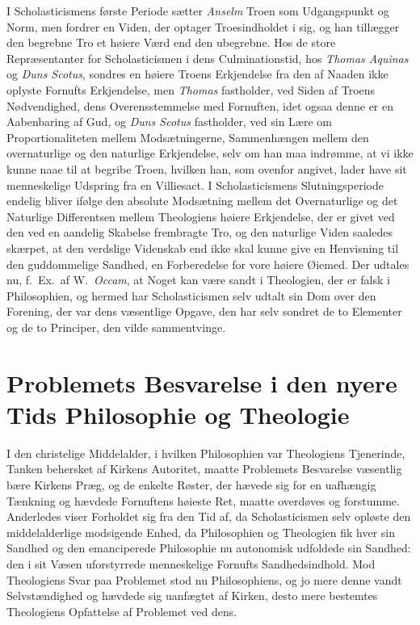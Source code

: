 \documentclass[12pt,a4paper]{book}
\newcommand{\opage}[1]{\marginnote{\footnotesize\textit{[#1]}}}
\begin{document}
I Scholasticismens første Periode sætter \emph{Anselm} Troen som Udgangspunkt og Norm,
men fordrer en Viden, der optager Troesindholdet i sig, og han tillægger den
begrebne Tro et høiere Værd end den ubegrebne. Hos de store Repræsentanter for
Scholasticismen i dens Culminationstid, hos \emph{Thomas Aquinas} og \emph{Duns Scotus}, sondres
en høiere Troens Erkjendelse fra den af Naaden ikke oplyste Fornufts Erkjendelse,
men \emph{Thomas} fastholder, ved Siden af Troens Nødvendighed, dens Overensstemmelse med
Fornuften, idet ogsaa denne er en Aabenbaring af Gud, og \emph{Duns Scotus} fastholder,
ved sin Lære om Proportionaliteten mellem Modsætningerne, Sammenhængen mellem den
overnaturlige og den naturlige Erkjendelse, selv om han maa indrømme, at vi ikke
kunne naae til at begribe Troen, hvilken han, som ovenfor angivet, lader have sit
menneskelige Udspring fra en Villiesact. I Scholasticismens Slut\opage{21}ningsperiode
endelig bliver ifølge den absolute Modsætning mellem det Overnaturlige og det
Naturlige Differentsen mellem Theologiens høiere Erkjendelse, der er givet ved den
ved en aandelig Skabelse frembragte Tro, og den naturlige Viden saaledes skærpet,
at den verdslige Videnskab end ikke skal kunne give en Henvisning til den
guddommelige Sandhed, en Forberedelse for vore høiere Øiemed. Der udtales nu, f.\
Ex.\ af W.\ \emph{Occam}, at Noget kan være sandt i Theologien, der er falsk i
Philosophien, og hermed har Scholasticismen selv udtalt sin Dom over den Forening,
der var dens væsentlige Opgave, den har selv sondret de to Elementer og de to
Principer, den vilde sammentvinge.

\section{Problemets Besvarelse i den nyere Tids Philosophie og Theologie}
\label{sec:nyere-tid}

\noindent I den christelige Middelalder, i hvilken Philosophien var Theologiens
Tjenerinde, Tanken behersket af Kirkens Autoritet, maatte Problemets Besvarelse
væsentlig bære Kirkens Præg, og de enkelte Røster, der hævede sig for en
uafhængig Tænkning og hævdede Fornuftens høieste Ret, maatte overdøves og
forstumme. Anderledes viser Forholdet sig fra den Tid af, da Scholasticismen selv
opløste den middelalderlige modsigende Enhed, da Philosophien og Theologien fik
hver sin Sandhed og den emanciperede Philosophie nu autonomisk udfoldede sin
Sandhed: den i sit Væsen uforstyrrede menneskelige Fornufts Sandhedsindhold. Mod
Theologiens Svar paa Problemet stod nu Philosophiens, og jo mere denne vandt
Selvstændighed og hævdede sig uanfægtet af Kirken, desto mere bestemtes
Theologiens Opfattelse af Problemet ved dens.
\end{document}
